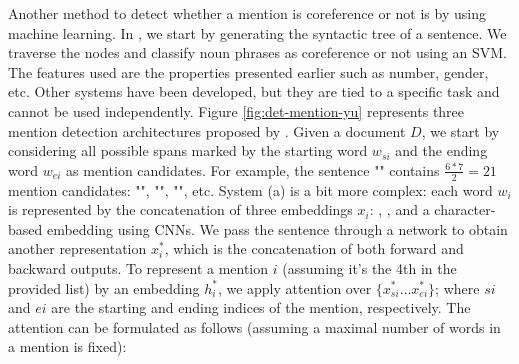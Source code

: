 \documentclass{KBook}
\begin{document}
Another method to detect whether a mention is coreference or not is by using machine learning. 
In \cite{2013-uryupina-moschitti}, we start by generating the syntactic tree of a sentence. 
We traverse the nodes and classify noun phrases as coreference or not using an SVM. 
The features used are the properties presented earlier such as number, gender, etc.
Other systems have been developed, but they are tied to a specific task and cannot be used independently. 
Figure \ref{fig:det-mention-yu} represents three mention detection architectures proposed by \citet{2020-yu-al}. 
Given a document $D$, we start by considering all possible spans marked by the starting word $w_{si}$ and the ending word $w_{ei}$ as mention candidates. 
For example, the sentence "" contains $\frac{6 * 7}{2} = 21$ mention candidates: "", "", "", etc.
System (a) is a bit more complex: each word $w_i$ is represented by the concatenation of three embeddings $x_i$: , , and a character-based embedding using CNNs. 
We pass the sentence through a  network to obtain another representation $x_i^*$, which is the concatenation of both forward and backward outputs. 
To represent a mention $i$ (assuming it's the 4th in the provided list) by an embedding $h^*_i$, we apply attention over $\{x^*_{si} \ldots x^*_{ei}\}$; where $si$ and $ei$ are the starting and ending indices of the mention, respectively. 
The attention can be formulated as follows (assuming a maximal number of words in a mention is fixed):
\end{document}
